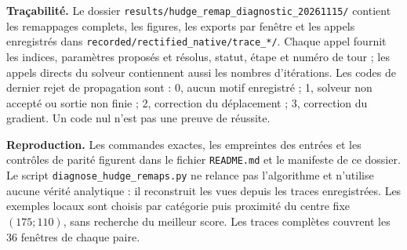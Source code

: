 \documentclass[11pt,a4paper,landscape]{article}
\begin{document}
\textbf{Traçabilité.} Le dossier
\texttt{results/hudge\_remap\_diagnostic\_20261115/} contient les remappages complets,
les figures, les exports par fenêtre et les appels enregistrés dans
\texttt{recorded/rectified\_native/trace\_*/}. Chaque appel fournit les indices,
paramètres proposés et résolus, statut, étape et numéro de tour ; les appels directs
du solveur contiennent aussi les nombres d'itérations.
Les codes de dernier rejet de propagation sont : 0, aucun motif enregistré ;
1, solveur non accepté ou sortie non finie ; 2, correction du déplacement ;
3, correction du gradient. Un code nul n'est pas une preuve de réussite.

\textbf{Reproduction.} Les commandes exactes, les empreintes des entrées et les contrôles
de parité figurent dans le fichier \texttt{README.md} et le manifeste de ce dossier.
Le script \texttt{diagnose\_hudge\_remaps.py} ne relance pas l'algorithme et n'utilise
aucune vérité analytique : il reconstruit les vues depuis les traces enregistrées.
Les exemples locaux sont choisis par catégorie puis proximité du centre fixe $(175;110)$,
sans recherche du meilleur score. Les traces complètes couvrent les 36 fenêtres de chaque paire.
\end{document}
